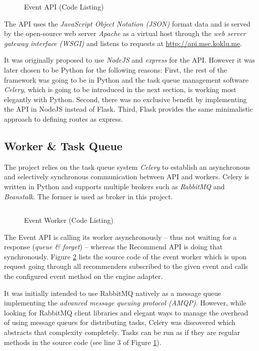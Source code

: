 \begin{figure}[ht]
    \inputminted{py}{./includes/source/framework/api/event.py}
    \caption{Event API (Code Listing)}
    \label{fig:implementation-framework-api-event}
\end{figure}

The API uses the \emph{JavaScript Object Notation (JSON)} format data and is served by the open-source web server \emph{Apache} as a virtual host through the \emph{web server gateway interface (WSGI)} and listens to requests at \url{http://api.msc.koklu.me}.

It was originally proposed to use \emph{NodeJS} and \emph{express} for the API. However it was later chosen to be Python for the following reasons: First, the rest of the framework was going to be in Python and the task queue management software \emph{Celery}, which is going to be introduced in the next section, is working most elegantly with Python. Second, there was no exclusive benefit by implementing the API in NodeJS instead of Flask. Third, Flask provides the same minimalistic approach to defining routes as express.

\subsection{Worker \& Task Queue}

The project relies on the task queue system \emph{Celery} to establish an asynchronous and selectively synchronous communication between API and workers. Celery is written in Python and supports multiple brokers such as \emph{RabbitMQ} and \emph{Beanstalk}. The former is used as broker in this project.



\begin{figure}[ht]
    \inputminted{py}{./includes/source/framework/worker/event.py}
    \caption{Event Worker (Code Listing)}
    \label{fig:implementation-framework-worker}
\end{figure}

The Event API is calling its worker asynchronously -- thus not waiting for a response (\emph{queue \& forget}) -- whereas the Recommend API is doing that synchronously. Figure \ref{fig:implementation-framework-worker} lists the source code of the event worker which is upon request going through all recommenders subscribed to the given event and calls the configured event method on the engine adapter.

It was initially intended to use RabbitMQ natively as a message queue implementing the \emph{advanced message queuing protocol (AMQP)}. However, while looking for RabbitMQ client libraries and elegant ways to manage the overhead of using message queues for distributing tasks, Celery was discovered which abstracts that complexity completely. Tasks can be run as if they are regular methods in the source code (see line 3 of Figure \ref{fig:implementation-framework-api-event}).

